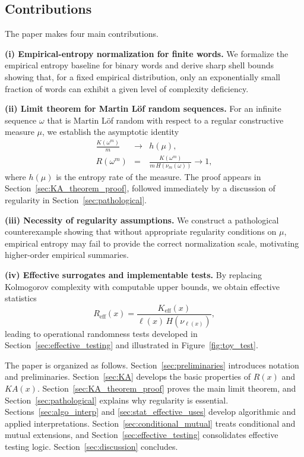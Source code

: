 \documentclass[12pt]{article}
\begin{document}
\subsection*{Contributions}

The paper makes four main contributions.

\noindent
{\bf (i) Empirical-entropy normalization for finite words.}
We formalize the empirical entropy baseline for binary words and derive sharp
shell bounds showing that, for a fixed empirical distribution, only an
exponentially small fraction of words can exhibit a given level of complexity
deficiency. 

\noindent
{\bf (ii) Limit theorem for Martin L\"of random sequences.}
For an infinite sequence $\omega$ that is Martin L\"of random with respect to a
regular constructive measure $\mu$, we establish the asymptotic identity
\begin{eqnarray}
\frac{K(\omega^m)}{m}
&\longrightarrow&
h(\mu),
\nonumber\\
R(\omega^m)
&=&
\frac{K(\omega^m)}{m\,H(\nu_m(\omega))}
\longrightarrow
1,
\label{eq:main_limit_form_roadmap}
\end{eqnarray}
where $h(\mu)$ is the entropy rate of the measure. The proof appears in
Section~\ref{sec:KA_theorem_proof}, followed immediately by a discussion of
regularity in Section~\ref{sec:pathological}.

\noindent
{\bf (iii) Necessity of regularity assumptions.}
We construct a pathological counterexample showing that without appropriate
regularity conditions on $\mu$, empirical entropy may fail to provide the
correct normalization scale, motivating higher-order empirical summaries.

\noindent
{\bf (iv) Effective surrogates and implementable tests.}
By replacing Kolmogorov complexity with computable upper bounds, we obtain
effective statistics
\[
R_{\mathrm{eff}}(x)=
\frac{K_{\mathrm{eff}}(x)}{\ell(x)\,H(\nu_{\ell(x)})},
\]
leading to operational randomness tests developed in
Section~\ref{sec:effective_testing} and illustrated in
Figure~\ref{fig:toy_test}.

\medskip

The paper is organized as follows.
Section~\ref{sec:preliminaries} introduces notation and preliminaries.
Section~\ref{sec:KA} develops the basic properties of $R(x)$ and $KA(x)$.
Section~\ref{sec:KA_theorem_proof} proves the main limit theorem, and
Section~\ref{sec:pathological} explains why regularity is essential.
Sections~\ref{sec:algo_interp} and \ref{sec:stat_effective_uses} develop
algorithmic and applied interpretations.
Section~\ref{sec:conditional_mutual} treats conditional and mutual extensions,
and Section~\ref{sec:effective_testing} consolidates effective testing logic.
Section~\ref{sec:discussion} concludes.
\end{document}
